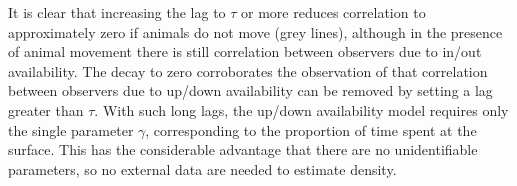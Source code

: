 \documentclass[useAMS, usenatbib, referee]{biom}\usepackage[]{graphicx}\usepackage[]{color}
\begin{document}
It is clear that increasing the lag to $\tau$ or more reduces correlation to approximately zero if animals do not move (grey lines), although in the presence of animal movement there is still correlation between observers due to in/out availability. The decay to zero corroborates the observation of \cite{Stevenson+al:19} that correlation between observers due to up/down availability can be removed by setting a lag greater than $\tau$. With such long lags, the up/down availability model requires only the single parameter $\gamma$, corresponding to the proportion of time spent at the surface. This has the considerable advantage that there are no unidentifiable parameters, so no external data are needed to estimate density.



\end{document}
